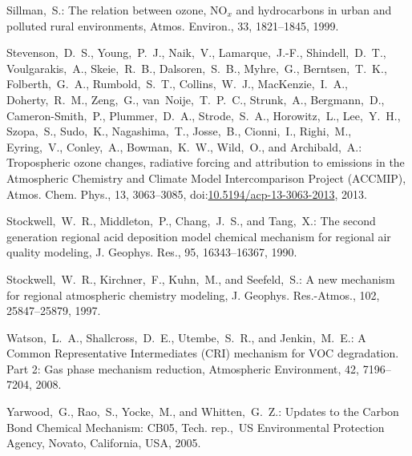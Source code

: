 \documentclass[acpd, online, hvmath]{copernicus}
\begin{document}
\begin{thebibliography}{34}
 Sillman,~S.: {The relation
    between ozone, NO$_{x}$ and hydrocarbons in urban and polluted
    rural environments}, Atmos. Environ., 33, 1821--1845,
  1999.


 Stevenson,~D.~S.,
  Young,~P.~J., Naik,~V., Lamarque,~J.-F., Shindell,~D.~T.,
  Voulgarakis,~A., Skeie,~R.~B., Dalsoren,~S.~B., Myhre,~G.,
  Berntsen,~T.~K., Folberth,~G.~A., Rumbold,~S.~T., Collins,~W.~J.,
  MacKenzie,~I.~A., Doherty,~R.~M., Zeng,~G., van~Noije,~T.~P.~C.,
  Strunk,~A., Bergmann,~D., Cameron-Smith,~P., Plummer,~D.~A.,
  Strode,~S.~A., Horowitz,~L., Lee,~Y.~H., Szopa,~S., Sudo,~K.,
  Nagashima,~T., Josse,~B., Cionni,~I., Righi,~M., Eyring,~V.,
  Conley,~A., Bowman,~K.~W., Wild,~O., and Archibald,~A.: Tropospheric
  ozone changes, radiative forcing and attribution to emissions in the
  Atmospheric Chemistry and Climate Model Intercomparison Project
  (ACCMIP), Atmos. Chem. Phys., 13, 3063--3085,
  doi:\href{http://dx.doi.org/10.5194/acp-13-3063-2013}{10.5194/acp-13-3063-2013}, 2013.



 Stockwell,~W.~R., Middleton,~P.,
  Chang,~J.~S., and Tang,~X.: {The second generation regional acid
    deposition model chemical mechanism for regional air quality
    modeling}, J. Geophys. Res., 95, 16343--16367, 1990.


 Stockwell,~W.~R., Kirchner,~F.,
  Kuhn,~M., and Seefeld,~S.: {A new mechanism for regional atmospheric
    chemistry modeling}, J. Geophys. Res.-Atmos., 102, 25847--25879,
  1997.


     Watson,~L.~A., Shallcross,~D.~E., Utembe,~S.~R., and Jenkin,~M.~E.: A Common Representative Intermediates (CRI) mechanism for VOC degradation. Part 2: Gas phase mechanism reduction, Atmospheric Environment, 42, 7196--7204, 2008.


Yarwood,~G., Rao,~S., Yocke,~M., and Whitten,~G.~Z.: Updates to the Carbon
Bond Chemical Mechanism: CB05, Tech. rep.,~US Environmental Protection
Agency, Novato, California, USA, 2005.

\end{thebibliography}
\end{document}
